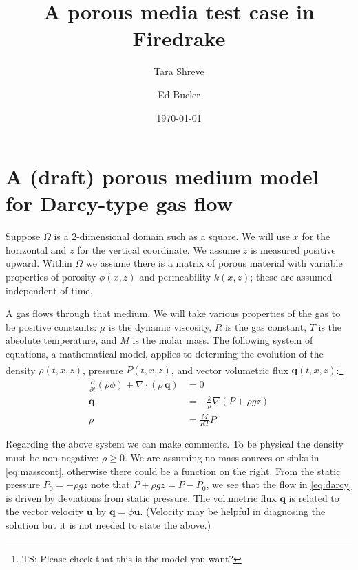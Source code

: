 \documentclass[11pt]{amsart}
\title{A porous media test case in Firedrake}
\author{Tara Shreve}
\author{Ed Bueler}
\date{\today}
\newcommand{\bq}{\mathbf{q}}
\newcommand{\bu}{\mathbf{u}}
\newcommand{\Div}{\nabla\cdot}
\newcommand{\grad}{\nabla}
\begin{document}
\maketitle

\thispagestyle{empty}

\section{A (draft) porous medium model for Darcy-type gas flow}

Suppose $\Omega$ is a 2-dimensional domain such as a square.  We will use $x$ for the horizontal and $z$ for the vertical coordinate.  We assume $z$ is measured positive upward.  Within $\Omega$ we assume there is a matrix of porous material with variable properties of porosity $\phi(x,z)$ and permeability $k(x,z)$; these are assumed independent of time.

A gas flows through that medium.  We will take various properties of the gas to be positive constants: $\mu$ is the dynamic viscosity, $R$ is the gas constant, $T$ is the absolute temperature, and $M$ is the molar mass.  The following system of equations, a mathematical model, applies to determing the evolution of the density $\rho(t,x,z)$, pressure $P(t,x,z)$, and vector volumetric flux $\bq(t,x,z)$:\footnote{TS: Please check that this is the model you want?}
\begin{subequations}
\label{eq:pmtime:early}
\begin{align}
\frac{\partial}{\partial t} \left(\rho \phi\right) + \Div \left(\rho\, \bq\right) &= 0 \label{eq:masscont} \\
\bq &= - \frac{k}{\mu} \grad\left(P + \rho g z\right) \label{eq:darcy} \\
\rho &= \frac{M}{RT} P \label{eq:idealgas}
\end{align}
\end{subequations}

Regarding the above system we can make comments.  To be physical the density must be non-negative: $\rho\ge 0$.  We are assuming no mass sources or sinks in \eqref{eq:masscont}, otherwise there could be a function on the right.  From the static pressure $P_0=-\rho g z$ note that $P+\rho g z = P-P_0$, we see that the flow in \eqref{eq:darcy} is driven by deviations from static pressure.  The volumetric flux $\bq$ is related to the vector velocity $\bu$ by $\bq = \phi \bu$.  (Velocity may be helpful in diagnosing the solution but it is not needed to state the above.)
\end{document}

